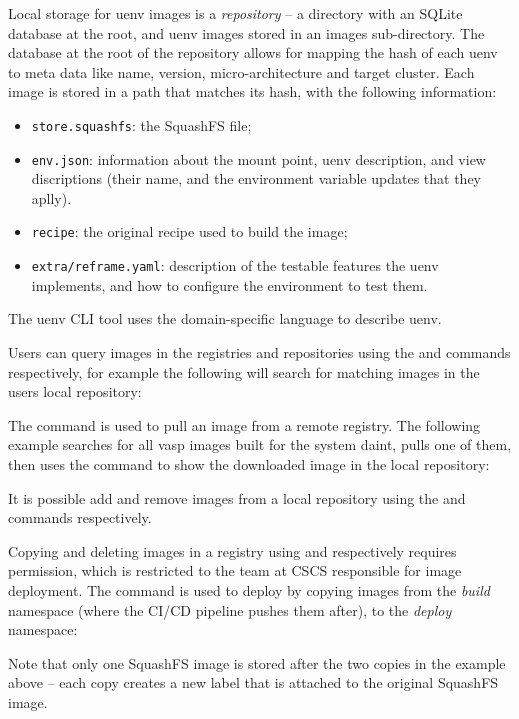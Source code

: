 Local storage for uenv images is a \emph{repository} -- a directory with an SQLite database at the root, and uenv images stored in an images sub-directory.
The database  at the root of the repository allows for mapping the hash of each uenv to meta data like name, version, micro-architecture and target cluster.
Each image is stored in a path that matches its hash, with the following information:
\begin{itemize}
\item  \lstinline{store.squashfs}: the SquashFS file;
\item  \lstinline{env.json}: information about the mount point, uenv description, and view discriptions (their name, and the environment variable updates that they aplly).
\item  \lstinline{recipe}: the original recipe used to build the image;
\item  \lstinline{extra/reframe.yaml}: description of the testable features the uenv implements, and how to configure the environment to test them.
\end{itemize}

The uenv CLI tool uses the domain-specific language  to describe uenv.

Users can query images in the registries and repositories using the  and  commands respectively, for example the following will search for matching images in the users local repository:


The  command is used to pull an image from a remote registry.
The following example searches for all vasp images built for the system daint, pulls one of them, then uses the  command to show the downloaded image in the local repository:


It is possible add and remove images from a local repository using the  and  commands respectively.

Copying and deleting images in a registry using  and  respectively requires permission, which is restricted to the team at CSCS responsible for image deployment.
The  command is used to deploy by copying images from the \emph{build} namespace (where the CI/CD pipeline pushes them after), to the \emph{deploy} namespace:

Note that only one SquashFS image is stored after the two copies in the example above -- each copy creates a new label that is attached to the original SquashFS image.


